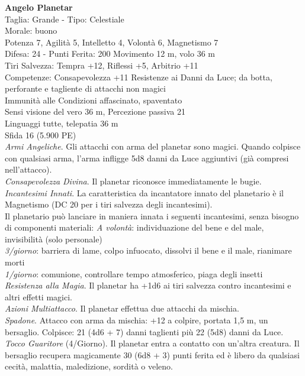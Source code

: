 \begin{multicols}{2}
\medskip\textbf{Angelo Planetar}\\
Taglia: Grande  - Tipo: Celestiale\\
Morale: buono\\
Potenza 7, Agilità 5, Intelletto 4, Volontà 6, Magnetismo 7\\
Difesa: 24 - Punti Ferita: 200
Movimento 12 m, volo 36 m\\
Tiri Salvezza: Tempra +12, Riflessi +5, Arbitrio +11\\
Competenze: Consapevolezza +11
Resistenze ai Danni da Luce; da botta, perforante e tagliente di attacchi non magici\\
Immunità alle Condizioni affascinato, spaventato\\
Sensi visione del vero 36 m, Percezione passiva 21\\
Linguaggi tutte, telepatia 36 m\\
Sfida 16 (5.900 PE)\\
\textit{Armi Angeliche}. Gli attacchi con arma del planetar sono magici. Quando colpisce con qualsiasi arma, l’arma infligge 5d8 danni da Luce aggiuntivi (già compresi nell’attacco).\\
\textit{Consapevolezza Divina}. Il planetar riconosce immediatamente le bugie.\\
\textit{Incantesimi Innati}. La caratteristica da incantatore innato del planetario è il Magnetismo (DC 20 per i tiri salvezza degli incantesimi).\\
Il planetario può lanciare in maniera innata i seguenti incantesimi, senza bisogno di componenti materiali: 
\textit{A volontà}: individuazione del bene e del male, invisibilità (solo personale)\\
\textit{3/giorno}: barriera di lame, colpo infuocato, dissolvi il bene e il male, rianimare morti\\
\textit{1/giorno}: comunione, controllare tempo atmosferico, piaga degli insetti\\
\textit{Resistenza alla Magia}. Il planetar ha +1d6 ai tiri salvezza contro incantesimi e altri effetti magici.\\
\textit{Azioni Multiattacco}. Il planetar effettua due attacchi da mischia.\\
\textit{Spadone}. Attacco con arma da mischia: +12 a colpire, portata 1,5 m, un bersaglio.
Colpisce: 21 (4d6 + 7) danni taglienti più 22 (5d8) danni da Luce.\\
\textit{Tocco Guaritore} (4/Giorno). Il planetar entra a contatto con un’altra creatura. Il bersaglio recupera magicamente 30 (6d8 + 3) punti ferita ed è libero da qualsiasi cecità, malattia, maledizione, sordità o veleno.\\

\end{multicols}
